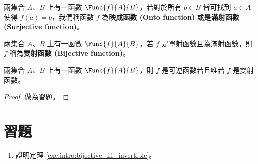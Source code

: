 \documentclass[12pt,a4paper,oneside]{report}
\begin{document}
\begin{CJK}{UTF8}{bkai}
\begin{mydef}[滿射函數]
\label{def:intro:surjective_function}
兩集合 $A$、$B$ 上有一函數 $\Func{f}{A}{B}$，若對於所有 $b\in{B}$ 皆可找到 $a\in{A}$ 使得 $f(a)=b$，我們稱函數 $f$ 為\textbf{映成函數 (Onto function)} 或是\textbf{滿射函數 (Surjective function)}。
\end{mydef}

\begin{mydef}[雙射函數]
\label{def:intro:bijective_function}
兩集合 $A$、$B$ 上有一函數 $\Func{f}{A}{B}$，若 $f$ 是單射函數且為滿射函數，則 $f$ 稱為\textbf{雙射函數 (Bijective function)}。
\end{mydef}

\begin{mythm}
\label{thm:intro:bijective_iff_invertible}
\label{exe:intro:bijective_iff_invertible}
兩集合 $A$、$B$ 上有一函數 $\Func{f}{A}{B}$，則 $f$ 是可逆函數若且唯若 $f$ 是雙射函數。
\end{mythm}
\begin{proof}
做為習題。
\end{proof}

\section*{習題}

\begin{enumerate}
\item 證明定理 \ref{exe:intro:bijective_iff_invertible}。
\end{enumerate}

\ifx \allfiles \undefined
\printindex[noun]

\clearpage
\end{CJK}
\end{document}
